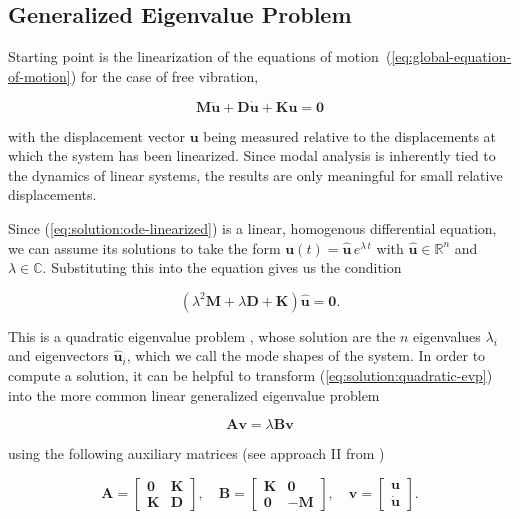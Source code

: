 \subsection{Generalized Eigenvalue Problem}

Starting point is the linearization of the equations of motion~(\ref{eq:global-equation-of-motion}) for the case of free vibration,

\begin{equation}
\boldsymbol{M}\ddot{\boldsymbol{u}} + \boldsymbol{D}\dot{\boldsymbol{u}} + \boldsymbol{K}\boldsymbol{u} = \boldsymbol{0} \label{eq:solution:ode-linearized}
\end{equation}

with the displacement vector $\boldsymbol{u}$ being measured relative to the displacements at which the system has been linearized.
Since modal analysis is inherently tied to the dynamics of linear systems, the results are only meaningful for small relative displacements.

Since (\ref{eq:solution:ode-linearized}) is a linear, homogenous differential equation, we can assume its solutions to take the form $\boldsymbol{u}(t) = \hat{\boldsymbol{u}}\,e^{\lambda\,t}$ with $\hat{\boldsymbol{u}} \in \mathbb{R}^n$ and $\lambda \in \mathbb{C}$. Substituting this into the equation gives us the condition

\begin{equation}
\left(\lambda^2 \boldsymbol{M} + \lambda \boldsymbol{D} + \boldsymbol{K}\right)\hat{\boldsymbol{u}} = \boldsymbol{0}. \label{eq:solution:quadratic-evp}
\end{equation}

This is a quadratic eigenvalue problem \cite{bib:dw07}, whose solution are the $n$ eigenvalues $\lambda_{i}$ and eigenvectors $\hat{\boldsymbol{u}}_{i}$, which we call the mode shapes of the system.
In order to compute a solution, it can be helpful to transform (\ref{eq:solution:quadratic-evp}) into the more common linear generalized eigenvalue problem

\begin{equation}
\boldsymbol{A}\boldsymbol{v} = \lambda\boldsymbol{B}\boldsymbol{v}
\end{equation}

using the following auxiliary matrices (see approach II from \cite{bib:dw07})

\begin{equation}
\boldsymbol{A}
=
\begin{bmatrix}
\boldsymbol{0} & \boldsymbol{K} \\
\boldsymbol{K} & \boldsymbol{D}
\end{bmatrix},
\quad
\boldsymbol{B}
=
\begin{bmatrix}
\boldsymbol{K} & \boldsymbol{0} \\
\boldsymbol{0} & \boldsymbol{-M}
\end{bmatrix},
\quad
\boldsymbol{v}
=
\begin{bmatrix}
\boldsymbol{u} \\
\dot{\boldsymbol{u}}
\end{bmatrix}.
\end{equation}

